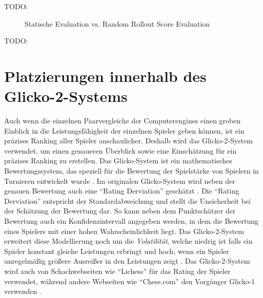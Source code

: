 TODO:

\begin{figure}[!ht]
    \centering
    \caption[Statische Evaluation vs. Score Evaluation]{Statische Evaluation vs. Random Rollout Score Evaluation}
    \label{fig:greedy-static-greedy-score-comparison}
\end{figure}

TODO:

\section{Platzierungen innerhalb des Glicko-2-Systems}

Auch wenn die einzelnen Paarvergleiche der Computerengines einen groben Einblick in die Leistungsfähigkeit der einzelnen Spieler geben können, ist ein präzises Ranking aller Spieler anschaulicher. Deshalb wird das Glicko-2-System verwendet, um einen genaueren Überblick sowie eine Einschätzung für ein präzises Ranking zu erstellen. Das Glicko-System ist ein mathematisches Bewertungssystem, das speziell für die Bewertung der Spielstärke von Spielern in Turnieren entwickelt wurde \cite[S. 377]{1999.GlickoMath}. Im originalen Glicko-System wird neben der genauen Bewertung auch eine \enquote{Rating Derviation} geschätzt \cite[S. 1f.]{2016.Glicko}. Die \enquote{Rating Derviation} entspricht der Standardabweichung und stellt die Unsicherheit bei der Schätzung der Bewertung dar. So kann neben dem Punktschätzer der Bewertung auch ein Konfidenzintervall angegeben werden, in dem die Bewertung eines Spielers mit einer hohen Wahrscheinlichkeit liegt. Das Glicko-2-System erweitert diese Modellierung noch um die \emph{Volatilität}, welche niedrig ist falls ein Spieler konstant gleiche Leistungen erbringt und hoch, wenn ein Spieler unregelmäßig größere Ausreißer in den Leistungen zeigt \cite[S. 1]{2022.Glicko2}. Das Glicko-2-System wird auch von Schachwebseiten wie \enquote{Lichess} für das Rating der Spieler verwendet, während andere Webseiten wie \enquote{Chess.com} den Vorgänger Glicko-1 verwenden \cite{2024.ChessRatingSystems}.

